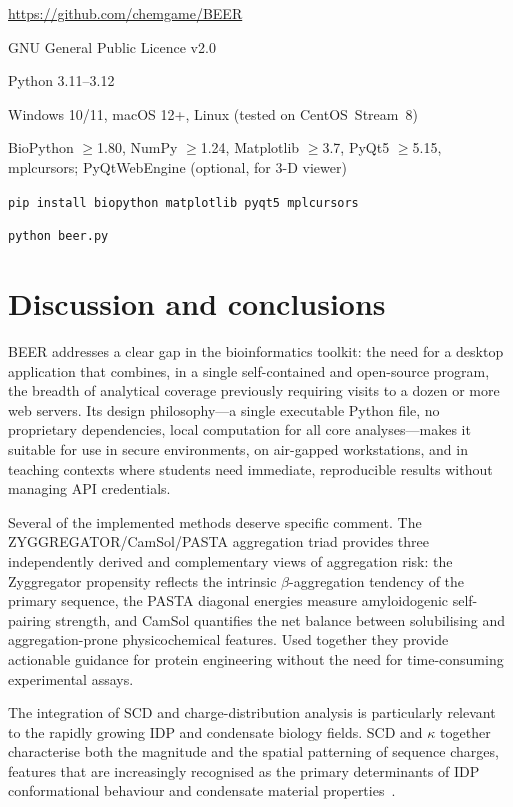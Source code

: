 \documentclass[12pt]{article}
\begin{document}
\begin{description}[noitemsep]
  \item[Repository] \url{https://github.com/chemgame/BEER}
  \item[Licence] GNU General Public Licence v2.0
  \item[Language] Python 3.11--3.12
  \item[Platforms] Windows 10/11, macOS 12+, Linux (tested on CentOS~Stream~8)
  \item[Dependencies] BioPython $\geq$1.80, NumPy $\geq$1.24,
        Matplotlib $\geq$3.7, PyQt5 $\geq$5.15, mplcursors;
        PyQtWebEngine (optional, for 3-D viewer)
  \item[Installation] \texttt{pip install biopython matplotlib pyqt5 mplcursors}
  \item[Launch] \texttt{python beer.py}
\end{description}

\section{Discussion and conclusions}

BEER addresses a clear gap in the bioinformatics toolkit: the need for a
desktop application that combines, in a single self-contained and open-source
program, the breadth of analytical coverage previously requiring visits to a
dozen or more web servers.
Its design philosophy---a single executable Python file, no proprietary
dependencies, local computation for all core analyses---makes it suitable
for use in secure environments, on air-gapped workstations, and in teaching
contexts where students need immediate, reproducible results without managing
API credentials.

Several of the implemented methods deserve specific comment.
The ZYGGREGATOR/CamSol/PASTA aggregation triad provides three independently
derived and complementary views of aggregation risk: the Zyggregator propensity
reflects the intrinsic $\beta$-aggregation tendency of the primary sequence,
the PASTA diagonal energies measure amyloidogenic self-pairing strength, and
CamSol quantifies the net balance between solubilising and aggregation-prone
physicochemical features.
Used together they provide actionable guidance for protein engineering without
the need for time-consuming experimental assays.

The integration of SCD and charge-distribution analysis is particularly
relevant to the rapidly growing IDP and condensate biology fields.
SCD and $\kappa$ together characterise both the magnitude and the spatial
patterning of sequence charges, features that are increasingly recognised as
the primary determinants of IDP conformational behaviour and condensate
material properties~\citep{pappu2023}.
\end{document}
